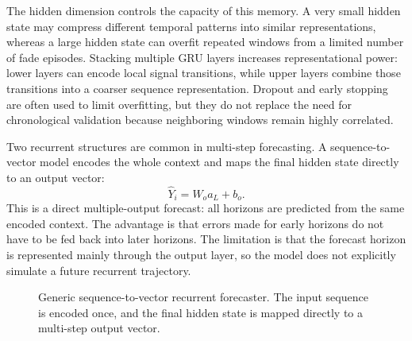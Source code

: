 The hidden dimension controls the capacity of this memory. A very small hidden
state may compress different temporal patterns into similar representations,
whereas a large hidden state can overfit repeated windows from a limited number
of fade episodes. Stacking multiple GRU layers increases representational power:
lower layers can encode local signal transitions, while upper layers combine
those transitions into a coarser sequence representation. Dropout
\cite{srivastava2014dropout} and early stopping \cite{prechelt1998early}
are often used to limit overfitting, but they do not replace the need
for chronological validation because neighboring windows remain highly
correlated.

Two recurrent structures are common in multi-step forecasting. A
sequence-to-vector model encodes the whole context and maps the final hidden
state directly to an output vector:
\[
  \widehat{Y}_i = W_o a_L + b_o .
\]
This is a direct multiple-output forecast: all horizons are predicted from the
same encoded context. The advantage is that errors made for early horizons do
not have to be fed back into later horizons. The limitation is that the forecast
horizon is represented mainly through the output layer, so the model does not
explicitly simulate a future recurrent trajectory.

\begin{figure}[htbp]
  \centering
  \caption{Generic sequence-to-vector recurrent forecaster. The input sequence is encoded once, and the final hidden state is mapped directly to a multi-step output vector.}
  \label{fig:sequence-to-vector-forecasting}
\end{figure}


